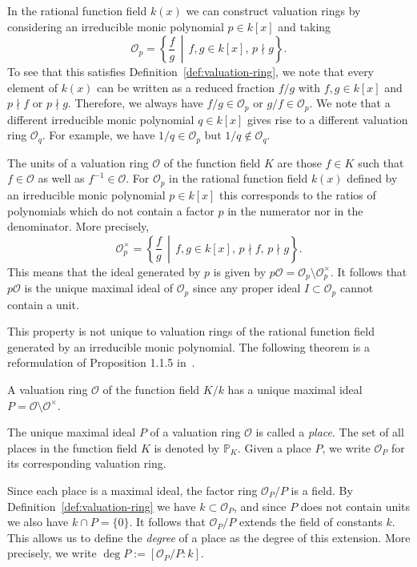 In the rational function field \(k(x)\) we can construct valuation rings by considering an irreducible monic polynomial \(p \in k[x]\) and taking
\[\mathcal{O}_{p} = \left\{ \frac{f}{g} \,\middle|\, f,g \in k[x] ,\, p \nmid g \right\}.\]
To see that this satisfies Definition~\ref{def:valuation-ring}, we note that every element of \(k(x)\) can be written as a reduced fraction \(f/g\) with \(f,g \in k[x]\) and \(p \nmid f\) or \(p \nmid g\). Therefore, we always have \(f/g \in \mathcal{O}_{p}\) or \(g/f \in \mathcal{O}_{p}\). We note that a different irreducible monic polynomial \(q \in k[x]\) gives rise to a different valuation ring \(\mathcal{O}_{q}\). For example, we have \(1/q \in \mathcal{O}_{p}\) but \(1/q \notin \mathcal{O}_{q}\).

The units of a valuation ring \(\mathcal{O}\) of the function field \(K\) are those \(f \in K\) such that \(f \in \mathcal{O}\) as well as \(f^{-1} \in \mathcal{O}\). For \(\mathcal{O}_{p}\) in the rational function field \(k(x)\) defined by an irreducible monic polynomial \(p \in k[x]\) this corresponds to the ratios of polynomials which do not contain a factor \(p\) in the numerator nor in the denominator. More precisely,
\[\mathcal{O}_{p}^{\times} = \left\{ \frac{f}{g} \,\middle|\, f,g \in k[x] ,\, p \nmid f ,\, p \nmid g \right\}.\]
This means that the ideal generated by \(p\) is given by \(p\mathcal{O} = \mathcal{O}_{p} \setminus \mathcal{O}_{p}^{\times}\). It follows that \(p\mathcal{O}\) is the unique maximal ideal of \(\mathcal{O}_{p}\) since any proper ideal \(I \subset \mathcal{O}_{p}\) cannot contain a unit.

This property is not unique to valuation rings of the rational function field generated by an irreducible monic polynomial. The following theorem is a reformulation of Proposition 1.1.5 in~\cite{stichtenoth-2009-algebraic-function-fields}.

\begin{theorem}%
  \label{thm:place-is-maximal-ideal}
  A valuation ring \(\mathcal{O}\) of the function field \(K / k\) has a unique maximal ideal \(P = \mathcal{O} \setminus \mathcal{O}^{\times}\).
\end{theorem}

The unique maximal ideal \(P\) of a valuation ring \(\mathcal{O}\) is called a \textit{place}. The set of all places in the function field \(K\) is denoted by \(\mathbb{P}_{K}\). Given a place \(P\), we write \(\mathcal{O}_{P}\) for its corresponding valuation ring.

Since each place is a maximal ideal, the factor ring \(\mathcal{O}_{P} / P\) is a field. By Definition~\ref{def:valuation-ring} we have \(k \subset \mathcal{O}_{P}\), and since \(P\) does not contain units we also have \(k \cap P = \{0\}\). It follows that \(\mathcal{O}_{P} / P\) extends the field of constants \(k\). This allows us to define the \textit{degree} of a place as the degree of this extension. More precisely, we write \(\deg{P} := [\mathcal{O}_{P} / P : k]\).

